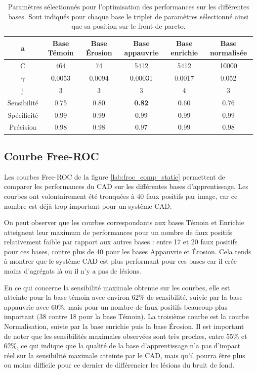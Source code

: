 \begin{table}[h!]
	\begin{center}
		\begin{tabular}{c c c c c c}
  \hline
  a	& Base Témoin 	& Base Érosion	& Base appauvrie& Base enrichie & Base normalisée \\
  \hline
 C 	& 464		& 74		& 5412		& 5412		& 10000 \\
\hline
$\gamma$& 0.0053	& 0.0094	& 0.00031	& 0.0017	& 0.052 \\
\hline
j	& 3		& 3		& 3		& 4		& 3	\\
\hline
\hline
Sensibilité& 0.75	& 0.80		& \textbf{0.82}		& 0.60		& 0.76	\\
\hline
Spécificité& 0.99	& 0.99		& 0.99		& 0.99		& 0.99 \\
\hline
Précision& 0.98		& 0.98		& 0.97		& 0.99		& 0.98 \\
\hline
 		\end{tabular}

	\end{center}
\caption{Paramètres sélectionnés pour l'optimisation des performances sur les différentes bases. Sont indiqués pour chaque base le triplet de paramètres sélectionné ainsi que sa position sur le front de pareto.}
\label{fig:paramsParams}
\end{table}

\FloatBarrier

\subsection{Courbe Free-ROC}

Les courbes Free-ROC de la figure \ref{lab:froc_comp_static} permettent de comparer les performances du CAD sur les différentes bases d'apprentissage. Les courbes ont volontairement été tronquées à 40 faux positifs par image, car ce nombre est déjà trop important pour un système CAD.

On peut observer que les courbes correspondants aux bases Témoin et Enrichie atteignent leur maximum de performances pour un nombre de faux positifs relativement faible par rapport aux autres bases : entre 17 et 20 faux positifs pour ces bases, contre plus de 40 pour les bases Appauvrie et Érosion. Cela tends à montrer que le système CAD est plus performant pour ces bases car il crée moins d'agrégats là ou il n'y a pas de lésions.

En ce qui concerne la sensibilité maximale obtenue sur les courbes, elle est atteinte pour la base témoin avec environ 62\% de sensibilité, suivie par la base appauvrie avec 60\%, mais pour un nombre de faux positifs beaucoup plus important (38 contre 18 pour la base Témoin). La troisième courbe est la courbe Normalisation, suivie par la base enrichie puis la base Érosion. Il est important de noter que les sensibilités maximales observées sont très proches, entre 55\% et 62\%, ce qui indique que la qualité de la base d'apprentissage n'a pas d'impact réel sur la sensibilité maximale atteinte par le CAD, mais qu'il pourra être plus ou moins difficile pour ce dernier de différencier les lésions du bruit de fond. 

